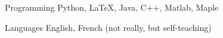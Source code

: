 


\begin{cvskills}

  \cvskill
    {Programming} %
    {Python, LaTeX, Java, C++, Matlab, Maple} %

  \cvskill
    {Languages} %
    {English, French (not really, but self-teaching)} %

\end{cvskills}
